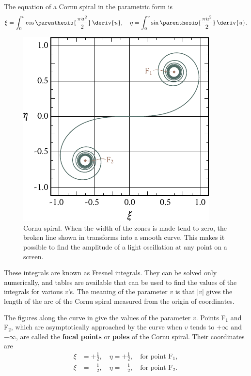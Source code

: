 The equation of a Cornu spiral in the parametric form is
\begin{equation}\label{eq:18_19}
	\xi = \int_0^v \cos\parenthesis{\frac{\pi u^2}{2}}\, \deriv{u}, \quad \eta = \int_0^v \sin\parenthesis{\frac{\pi u^2}{2}}\, \deriv{u}.
\end{equation}

\begin{figure}[!htb]
	\begin{center}
		\includegraphics[scale=1]{figures/ch_18/fig_18_19.pdf}
        \caption[]{Cornu spiral. When the width of the zones is made tend to zero, the broken line shown in  transforms into a smooth curve. This makes it possible to find the amplitude of a light oscillation at any point on a screen.}
		\label{fig:18_19}
	\end{center}
	\vspace{-0.8cm}
\end{figure}

\noindent
These integrals are known as Fresnel integrals.
They can be solved only numerically, and tables are available that can be used to find the values of the integrals for various $v$'s.
The meaning of the parameter $v$ is that $|v|$ gives the length of the arc of the Cornu spiral measured from the origin of coordinates.

The figures along the curve in  give the values of the parameter $v$.
Points F$_1$ and F$_2$, which are asymptotically approached by the curve when $v$ tends to $+\infty$ and $-\infty$, are called the \textbf{focal points} or \textbf{poles} of the Cornu spiral.
Their coordinates are
\begin{align*}
	\xi &= + \frac{1}{2}, \quad \eta = + \frac{1}{2}, \quad \text{for point F$_1$},\\
	\xi &= - \frac{1}{2}, \quad \eta = - \frac{1}{2}, \quad \text{for point F$_2$}.
\end{align*}

